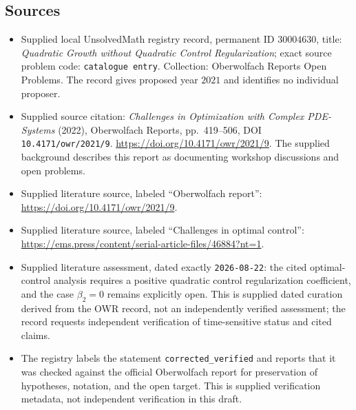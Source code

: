 \documentclass[11pt]{article}
\begin{document}
\subsection{Sources}
\begin{itemize}
\item Supplied local UnsolvedMath registry record, permanent ID \(30004630\), title: \emph{Quadratic Growth without Quadratic Control Regularization}; exact source problem code: \texttt{catalogue entry}. Collection: Oberwolfach Reports Open Problems. The record gives proposed year \(2021\) and identifies no individual proposer.
\item Supplied source citation: \emph{Challenges in Optimization with Complex PDE-Systems} (2022), Oberwolfach Reports, pp.~419--506, DOI \texttt{10.4171/owr/2021/9}. \url{https://doi.org/10.4171/owr/2021/9}. The supplied background describes this report as documenting workshop discussions and open problems.
\item Supplied literature source, labeled ``Oberwolfach report'': \url{https://doi.org/10.4171/owr/2021/9}.
\item Supplied literature source, labeled ``Challenges in optimal control'': \url{https://ems.press/content/serial-article-files/46884?nt=1}.
\item Supplied literature assessment, dated exactly \texttt{2026-08-22}: the cited optimal-control analysis requires a positive quadratic control regularization coefficient, and the case \(\beta_2=0\) remains explicitly open. This is supplied dated curation derived from the OWR record, not an independently verified assessment; the record requests independent verification of time-sensitive status and cited claims.
\item The registry labels the statement \texttt{corrected\_verified} and reports that it was checked against the official Oberwolfach report for preservation of hypotheses, notation, and the open target. This is supplied verification metadata, not independent verification in this draft.
\end{itemize}
\end{document}
